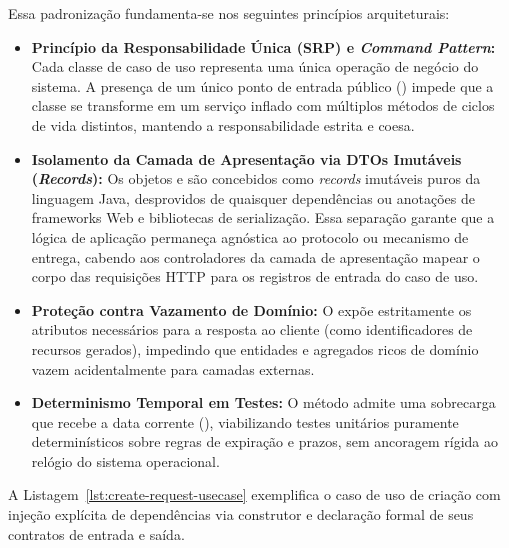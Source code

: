 Essa padronização fundamenta-se nos seguintes princípios arquiteturais:
\begin{itemize}
  \item \textbf{Princípio da Responsabilidade Única (SRP) e \textit{Command Pattern}:} Cada classe de caso de uso representa uma única operação de negócio do sistema. A presença de um único ponto de entrada público () impede que a classe se transforme em um serviço inflado com múltiplos métodos de ciclos de vida distintos, mantendo a responsabilidade estrita e coesa.
  \item \textbf{Isolamento da Camada de Apresentação via DTOs Imutáveis (\textit{Records}):} Os objetos  e  são concebidos como \textit{records} imutáveis puros da linguagem Java, desprovidos de quaisquer dependências ou anotações de frameworks Web e bibliotecas de serialização. Essa separação garante que a lógica de aplicação permaneça agnóstica ao protocolo ou mecanismo de entrega, cabendo aos controladores da camada de apresentação mapear o corpo das requisições HTTP para os registros de entrada do caso de uso.
  \item \textbf{Proteção contra Vazamento de Domínio:} O  expõe estritamente os atributos necessários para a resposta ao cliente (como identificadores de recursos gerados), impedindo que entidades e agregados ricos de domínio vazem acidentalmente para camadas externas.
  \item \textbf{Determinismo Temporal em Testes:} O método  admite uma sobrecarga que recebe a data corrente (), viabilizando testes unitários puramente determinísticos sobre regras de expiração e prazos, sem ancoragem rígida ao relógio do sistema operacional.
\end{itemize}

A Listagem~\ref{lst:create-request-usecase} exemplifica o caso de uso de criação com injeção explícita de dependências via construtor e declaração formal de seus contratos de entrada e saída.

